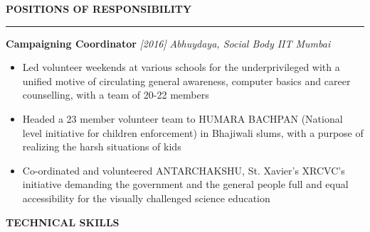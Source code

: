 \documentclass[10 pt]{article}%
\begin{document}
{{{{{{{\begin{flushleft}\bf{\Large{POSITIONS OF RESPONSIBILITY}}\end{flushleft}
\vspace{-1mm}
\hrule
\vspace{1 pt}
{\flushleft \textbf {\large{Campaigning Coordinator}} \hfill {{{\em{[2016]}}}}
	\vspace{-0.8em}
	{\flushleft \em{Abhuydaya, Social Body IIT Mumbai}}
	\vspace{-5pt}
	\begin{itemize}[leftmargin=*]
		\setlength\itemsep{1.5pt}
		\setlength\parskip{1.5pt}
		\item Led volunteer weekends at various schools for the underprivileged with a unified motive of circulating general awareness, computer basics and career counselling, with a team of 20-22 members
		\item Headed a 23 member volunteer team to HUMARA BACHPAN (National level initiative for children enforcement) in Bhajiwali slums, with a purpose of realizing the harsh situations of kids
		\item Co-ordinated and volunteered ANTARCHAKSHU, St. Xavier’s XRCVC’s initiative demanding the government and the general people full and equal accessibility for the visually challenged science education
	\end{itemize}
\begin{flushleft}\bf{\Large{TECHNICAL SKILLS}}\end{flushleft}
}}}}}}}}
\end{document}
